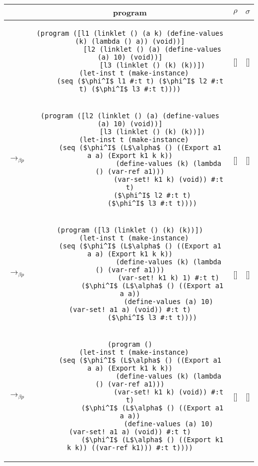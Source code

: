 \begin{table}[h!]
  \vspace{1cm}
  \centering
  \footnotesize
  \begin{tabular}{lc|c|c}
    &\textbf{program} & \textbf{$\rho$} & \textbf{$\sigma$} \\ \hline \hline
    &\begin{lstlisting}[mathescape]
(program ([l1 (linklet () (a k) (define-values (k) (lambda () a)) (void))]
           [l2 (linklet () (a) (define-values (a) 10) (void))]
           [l3 (linklet () (k) (k))])
  (let-inst t (make-instance)
     (seq ($\phi^I$ l1 #:t t) ($\phi^I$ l2 #:t t) ($\phi^I$ l3 #:t t))))
    \end{lstlisting} & [] & [] \\ \hline
    $\longrightarrow_{\beta p}$&\begin{lstlisting}[mathescape]
(program ([l2 (linklet () (a) (define-values (a) 10) (void))]
           [l3 (linklet () (k) (k))])
  (let-inst t (make-instance)
     (seq ($\phi^I$ (L$\alpha$ () ((Export a1 a a) (Export k1 k k))
                   (define-values (k) (lambda () (var-ref a1)))
                   (var-set! k1 k) (void)) #:t t)
           ($\phi^I$ l2 #:t t)
           ($\phi^I$ l3 #:t t))))
    \end{lstlisting} & [] & [] \\ \hline
    $\longrightarrow_{\beta p}$&\begin{lstlisting}[mathescape]
(program ([l3 (linklet () (k) (k))])
  (let-inst t (make-instance)
     (seq ($\phi^I$ (L$\alpha$ () ((Export a1 a a) (Export k1 k k))
                   (define-values (k) (lambda () (var-ref a1)))
                   (var-set! k1 k) 1) #:t t)
           ($\phi^I$ (L$\alpha$ () ((Export a1 a a))
                   (define-values (a) 10) (var-set! a1 a) (void)) #:t t)
           ($\phi^I$ l3 #:t t))))
    \end{lstlisting} & [] & [] \\ \hline
    $\longrightarrow_{\beta p}$&\begin{lstlisting}[mathescape]
(program ()
  (let-inst t (make-instance)
     (seq ($\phi^I$ (L$\alpha$ () ((Export a1 a a) (Export k1 k k))
                   (define-values (k) (lambda () (var-ref a1)))
                   (var-set! k1 k) (void)) #:t t)
           ($\phi^I$ (L$\alpha$ () ((Export a1 a a))
                   (define-values (a) 10) (var-set! a1 a) (void)) #:t t)
           ($\phi^I$ (L$\alpha$ () ((Export k1 k k)) ((var-ref k1))) #:t t))))
    \end{lstlisting} & [] & [] \\ \hline
  \end{tabular}
\end{table}

